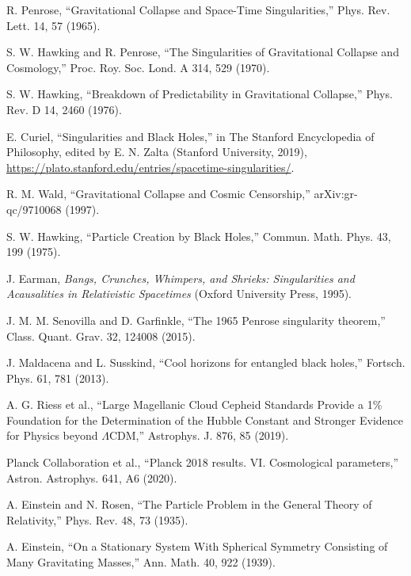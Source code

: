 \documentclass{article}
\begin{document}
\begin{thebibliography}{9}

R. Penrose, ``Gravitational Collapse and Space-Time Singularities,'' Phys. Rev. Lett. 14, 57 (1965).

S. W. Hawking and R. Penrose, ``The Singularities of Gravitational Collapse and Cosmology,'' Proc. Roy. Soc. Lond. A 314, 529 (1970).

S. W. Hawking, ``Breakdown of Predictability in Gravitational Collapse,'' Phys. Rev. D 14, 2460 (1976).

E. Curiel, ``Singularities and Black Holes,'' in The Stanford Encyclopedia of Philosophy, edited by E. N. Zalta (Stanford University, 2019), \url{https://plato.stanford.edu/entries/spacetime-singularities/}.

R. M. Wald, ``Gravitational Collapse and Cosmic Censorship,'' arXiv:gr-qc/9710068 (1997).

S. W. Hawking, ``Particle Creation by Black Holes,'' Commun. Math. Phys. 43, 199 (1975).

J. Earman, \textit{Bangs, Crunches, Whimpers, and Shrieks: Singularities and Acausalities in Relativistic Spacetimes} (Oxford University Press, 1995).

J. M. M. Senovilla and D. Garfinkle, ``The 1965 Penrose singularity theorem,'' Class. Quant. Grav. 32, 124008 (2015).

J. Maldacena and L. Susskind, ``Cool horizons for entangled black holes,'' Fortsch. Phys. 61, 781 (2013).

A. G. Riess et al., ``Large Magellanic Cloud Cepheid Standards Provide a 1\% Foundation for the Determination of the Hubble Constant and Stronger Evidence for Physics beyond \(\Lambda\)CDM,'' Astrophys. J. 876, 85 (2019).

Planck Collaboration et al., ``Planck 2018 results. VI. Cosmological parameters,'' Astron. Astrophys. 641, A6 (2020).

A. Einstein and N. Rosen, ``The Particle Problem in the General Theory of Relativity,'' Phys. Rev. 48, 73 (1935).

A. Einstein, ``On a Stationary System With Spherical Symmetry Consisting of Many Gravitating Masses,'' Ann. Math. 40, 922 (1939).


\end{thebibliography}
\end{document}
